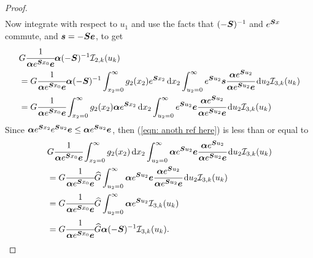 \begin{proof}
\begin{align}
	\end{align}
	Now integrate with respect to \(u_1\) and use the facts that \((-\boldsymbol{S})^{-1}\) and \(e^{\boldsymbol{S}x}\) commute, and \(\boldsymbol s = - \boldsymbol{S} \boldsymbol e \), to get 
	\begin{align}
		\nonumber & G  \cfrac{1}{\boldsymbol \alpha e^{\boldsymbol{S}x_0}\boldsymbol e} \boldsymbol \alpha (-\boldsymbol{S})^{-1}  \mathcal I_{2,k}(u_k) 
		\\& = G  \cfrac{1}{\boldsymbol \alpha e^{\boldsymbol{S}x_0}\boldsymbol e}  \boldsymbol \alpha (-\boldsymbol{S})^{-1} \int_{x_2=0}^\infty g_2(x_2)  e^{\boldsymbol{S}x_2} \, \mathrm{d} x_2 \int_{u_2=0}^\infty e^{\boldsymbol{S}u_2}\boldsymbol s \cfrac{\boldsymbol \alpha e^{\boldsymbol{S}u_2}}{\boldsymbol \alpha e^{\boldsymbol{S}u_2}\boldsymbol e}\, \mathrm{d} u_2 \mathcal I_{3,k}(u_k)\label{eqn: rep from here}
		\\& = G  \cfrac{1}{\boldsymbol \alpha e^{\boldsymbol{S}x_0}\boldsymbol e}  \int_{x_2=0}^\infty g_2(x_2) \boldsymbol \alpha e^{\boldsymbol{S}x_2} \, \mathrm{d} x_2 \int_{u_2=0} ^\infty e^{\boldsymbol{S}u_2}\boldsymbol e \cfrac{\boldsymbol \alpha e^{\boldsymbol{S}u_2}}{\boldsymbol \alpha e^{\boldsymbol{S}u_2}\boldsymbol e}\, \mathrm{d} u_2 \mathcal I_{3,k}(u_k)\label{eqn: anoth ref here}
	\end{align}
	Since \(\boldsymbol \alpha e^{\boldsymbol{S}x_2}e^{\boldsymbol{S}u_2}\boldsymbol e \leq \boldsymbol \alpha e^{\boldsymbol{S}u_2}\boldsymbol e \), then (\ref{eqn: anoth ref here}) is less than or equal to 
	\begin{align}
		& G  \cfrac{1}{\bs \alpha e^{\bs{S}x_0}\bs e}  \int_{x_2=0}^\infty g_2(x_2) \wrt x_2 \int_{u_2=0}^\infty \bs \alpha e^{\bs{S}u_2}\bs e \cfrac{\bs \alpha e^{\bs{S}u_2}}{\bs \alpha e^{\bs{S}u_2}\bs e}\wrt u_2 \mathcal I_{3,k}(u_k) \nonumber
		\\& =G  \cfrac{1}{\bs \alpha e^{\bs{S}x_0 }\bs e}  \widehat G  \int_{u_2=0}^\infty \bs \alpha e^{\bs{S}u_2}\bs e \cfrac{\bs \alpha e^{\bs{S}u_2}}{\bs \alpha e^{\bs{S}u_2}\bs e}\wrt u_2 \mathcal I_{3,k}(u_k) \nonumber
		\\& =G  \cfrac{1}{\bs \alpha e^{\bs{S} x_0 }\bs e}  \widehat G  \int_{u_2=0}^\infty \bs \alpha e^{\bs{S}u_2} \mathcal I_{3,k}(u_k) \nonumber
		\\& =G  \cfrac{1}{\bs \alpha e^{\bs{S} x_0 }\bs e}  \widehat G \bs \alpha (-\bs S)^{-1} \mathcal I_{3,k}(u_k).  \label{eqn: rep to here}

\end{align}
\end{proof}
